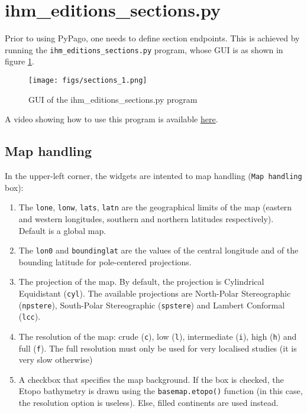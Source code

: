 \section{ihm\_editions\_sections.py}

Prior to using PyPago, one needs to define section endpoints. This is
achieved by running the \verb+ihm_editions_sections.py+ program, whose
GUI is as shown in figure \ref{fig:sections_1}.\\

\begin{figure}[h!]
\centering
\texttt{[image: figs/sections\_1.png]}
\caption{GUI of the ihm\_editions\_sections.py program}
\label{fig:sections_1}
\end{figure}

A video showing how to use this program is available
\href{https://dl.dropboxusercontent.com/u/99128427/Site/barriernicolas/Python_NCL_files/video_section_def.mov}{here}.\\

\subsection{Map handling}

In the upper-left corner, the widgets are intented to map handling (\verb+Map handling+ box):
\begin{enumerate}
\item The \verb+lone+, \verb+lonw+, \verb+lats+, \verb+latn+ are
  the geographical limits of the map (eastern and western longitudes,
  southern and northern latitudes respectively). Default is a global map.
\item The \verb+lon0+ and \verb+boundinglat+ are the values of the
  central longitude and of the bounding latitude for pole-centered projections.
\item The projection of the map. By default, the projection is {Cylindrical Equidistant}
(\verb+cyl+). The available projections are {North-Polar
  Stereographic} (\verb+npstere+), {South-Polar Stereographic}
(\verb+spstere+) and {Lambert Conformal} (\verb+lcc+).
\item The resolution of the map: crude (\verb+c+), low (\verb+l+),
  intermediate (\verb+i+), high (\verb+h+) and full (\verb+f+). The
  full resolution must only be used for very localised studies (it is
  very slow otherwise)
\item A checkbox that specifies the map background. If the box is
  checked, the Etopo bathymetry is drawn using the
  \verb+basemap.etopo()+ function (in this case, the resolution option
  is useless). Else, filled continents are used instead.
\end{enumerate}


